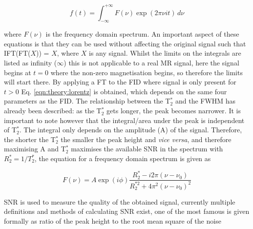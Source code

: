 \begin{equation}
    f(t) = \int_{-\infty}^{+\infty} F(\nu)\exp(2 \pi \nu i t) \, d\nu
    \label{eqn:theory:inverse}
\end{equation}

\noindent where $F(\nu)$ is the frequency domain spectrum. An important aspect of these equations is that they can be used without affecting the original signal such that IFT(FT($X$)) = $X$, where $X$ is any signal. Whilst the limits on the integrals are listed as infinity ($\infty$) this is not applicable to a real MR signal, here the signal begins at $t=0$ where the non-zero magnetisation begins, so therefore the limits will start there. By applying a \ac{FT} to the \ac{FID} where signal is only present  for $t > 0$ Eq. \ref{eqn:theory:lorentz} is obtained, which depends on the same four parameters as the \ac{FID}. The relationship between the T$_2^*$ and the FWHM has already been described: as the T$_2^*$ gets longer, the peak becomes narrower. It is important to note however that the integral/area under the peak is independent of T$_2^*$. The integral only depends on the amplitude (A) of the signal. Therefore, the shorter the T$_2^*$ the smaller the peak height and \textit{vice versa}, and therefore maximising A and T$_2^*$ maximises the available \ac{SNR} in the spectrum with $R_2^* = 1/T_2^*$, the equation for a frequency domain spectrum is given as

\begin{equation}
    F(\nu) = A\exp(i\phi)\frac{R_2^*-i2\pi(\nu-\nu_0)}{R_2^{*2}+4\pi^2(\nu-\nu_0)^2}
    \label{eqn:theory:lorentz}
\end{equation}

\ac{SNR} is used to measure the quality of the obtained signal, currently multiple definitions and methods of calculating \ac{SNR} exist, one of the most famous is given formally as ratio of the peak height to the root mean square of the noise \cite{Ernst1987PrinciplesDimensions.} 

